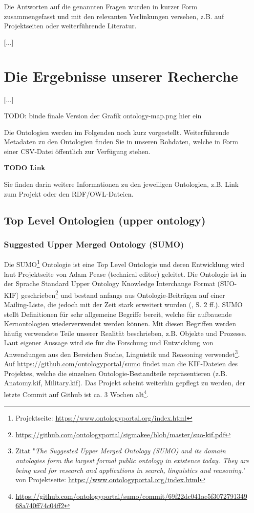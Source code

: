 \documentclass{article}
\begin{document}
Die Antworten auf die genannten Fragen wurden in kurzer Form zusammengefasst und mit den relevanten Verlinkungen versehen, z.B. auf Projektseiten oder weiterführende Literatur.

[...]


\section{Die Ergebnisse unserer Recherche}

[...]

TODO: binde finale Version der Grafik ontology-map.png hier ein

Die Ontologien werden im Folgenden noch kurz vorgestellt.
Weiterführende Metadaten zu den Ontologien finden Sie in unseren Rohdaten, welche in Form einer CSV-Datei öffentlich zur Verfügung stehen.

\textbf{TODO Link}

Sie finden darin weitere Informationen zu den jeweiligen Ontologien, z.B. Link zum Projekt oder den RDF/OWL-Dateien.

\subsection{Top Level Ontologien (upper ontology)}

\subsubsection{Suggested Upper Merged Ontology (SUMO)}

Die SUMO\footnote{Projektseite: \url{https://www.ontologyportal.org/index.html}} Ontologie ist eine Top Level Ontologie und deren Entwicklung wird laut Projektseite von Adam Pease (technical editor) geleitet.
Die Ontologie ist in der Sprache Standard Upper Ontology Knowledge Interchange Format (SUO-KIF) geschrieben\footnote{\url{https://github.com/ontologyportal/sigmakee/blob/master/suo-kif.pdf}} und
bestand anfangs aus Ontologie-Beiträgen auf einer Mailing-Liste, die jedoch mit der Zeit stark erweitert wurden (\cite{niles2001towards}, S. 2 ff.).
SUMO stellt Definitionen für sehr allgemeine Begriffe bereit, welche für aufbauende Kernontologien wiederverwendet werden können.
Mit diesen Begriffen werden häufig verwendete Teile unserer Realität beschrieben, z.B. Objekte und Prozesse.
Laut eigener Aussage wird sie für die Forschung und Entwicklung von Anwendungen aus den Bereichen Suche, Linguistik und Reasoning verwendet\footnote{Zitat "\textit{The Suggested Upper Merged Ontology (SUMO) and its domain ontologies form the largest formal public ontology in existence today. They are being used for research and applications in search, linguistics and reasoning.}" von Projektseite: \url{https://www.ontologyportal.org/index.html}}.
Auf \url{https://github.com/ontologyportal/sumo} findet man die KIF-Dateien des Projektes, welche die einzelnen Ontologie-Bestandteile repräsentieren (z.B. Anatomy.kif, Military.kif).
Das Projekt scheint weiterhin gepflegt zu werden, der letzte Commit auf Github ist ca. 3 Wochen alt\footnote{\url{https://github.com/ontologyportal/sumo/commit/69f22dc041ae5f307279134968a740ff74c04ff2}}.
\end{document}
